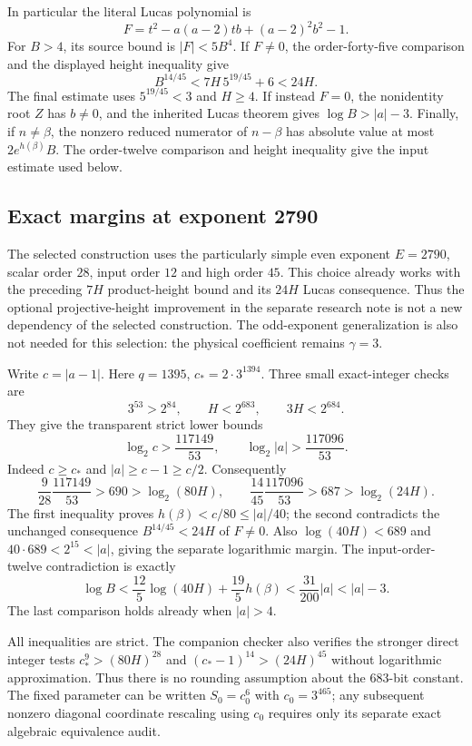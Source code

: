 In particular the literal Lucas polynomial is
\[
 F=t^2-a(a-2)tb+(a-2)^2b^2-1.
\]
For $B>4$, its source bound is $|F|<5B^4$.  If $F\ne0$, the
order-forty-five comparison and the displayed height inequality give
\[
 B^{14/45}<7H\,5^{19/45}+6<24H.
\]
The final estimate uses $5^{19/45}<3$ and $H\ge4$.
If instead $F=0$, the nonidentity root $Z$ has $b\ne0$, and the
inherited Lucas theorem gives $\log B>|a|-3$.
Finally, if $n\ne\beta$, the nonzero reduced numerator of $n-\beta$
has absolute value at most $2e^{h(\beta)}B$.  The order-twelve
comparison and height inequality give the input estimate used below.

\subsection{Exact margins at exponent 2790}


The selected construction uses the particularly simple even exponent
$E=2790$, scalar order $28$, input order $12$ and high order $45$.
This choice already works with the preceding $7H$ product-height bound
and its $24H$ Lucas consequence.  Thus the optional projective-height
improvement in the separate research note is not a new dependency of the selected construction.
The odd-exponent generalization is also not needed for this selection:
the physical coefficient remains $\gamma=3$.

Write $c=|a-1|$.  Here $q=1395$, $c_*=2\cdot3^{1394}$.
Three small exact-integer checks
are
\[
 3^{53}>2^{84},\qquad H<2^{683},\qquad 3H<2^{684}.
\]
They give the transparent strict lower bounds
\[
 \log_2c>\frac{117149}{53},\qquad
 \log_2|a|>\frac{117096}{53}.
\]
Indeed $c\ge c_*$ and $|a|\ge c-1\ge c/2$.  Consequently
\[
 \frac9{28}\frac{117149}{53}>690>\log_2(80H),
 \qquad
 \frac{14}{45}\frac{117096}{53}>687>\log_2(24H).
\]
The first inequality proves $h(\beta)<c/80\le|a|/40$; the second
contradicts the unchanged consequence $B^{14/45}<24H$ of $F\ne0$.
Also $\log(40H)<689$ and $40\cdot689<2^{15}<|a|$, giving the
separate logarithmic margin.  The input-order-twelve contradiction is
exactly
\[
 \log B<\frac{12}{5}\log(40H)+\frac{19}{5}h(\beta)
 <\frac{31}{200}|a|<|a|-3.
\]
The last comparison holds already when $|a|>4$.

All inequalities are strict.  The companion checker also verifies the
stronger direct integer tests
$c_*^9>(80H)^{28}$ and
$(c_*-1)^{14}>(24H)^{45}$ without logarithmic approximation.
Thus there is no rounding assumption about the 683-bit constant.
The fixed parameter can be written $S_0=c_0^6$ with $c_0=3^{465}$;
any subsequent nonzero diagonal coordinate rescaling using $c_0$
requires only its separate exact algebraic equivalence audit.

